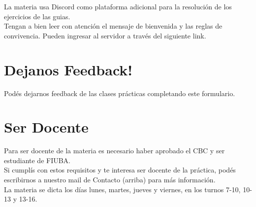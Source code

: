 \documentclass[
  letterpaper,
  DIV=11,
  numbers=noendperiod]{scrreprt}
\begin{document}

La materia usa Discord como plataforma adicional para la resolución de
los ejercicios de las guias.\\
Tengan a bien leer con atención el mensaje de bienvenida y las reglas de
convivencia. Pueden ingresar al servidor a través del siguiente link.

\section*{Dejanos Feedback!}\label{feedback}


Podés dejarnos feedback de las clases prácticas completando este
formulario.

\section*{Ser Docente}\label{docentes}


Para ser docente de la materia es necesario haber aprobado el CBC y ser
estudiante de FIUBA.\\
Si cumplís con estos requisitos y te interesa ser docente de la
práctica, podés escribirnos a nuestro mail de Contacto (arriba) para más
información.\\
La materia se dicta los días lunes, martes, jueves y viernes, en los
turnos 7-10, 10-13 y 13-16.
\end{document}
